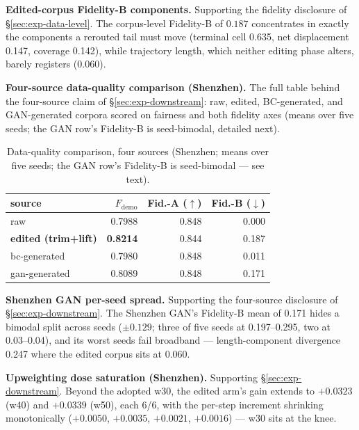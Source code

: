 \textbf{Edited-corpus Fidelity-B components.} Supporting the fidelity
disclosure of \S\ref{sec:exp-data-level}. The corpus-level Fidelity-B of
$0.187$ concentrates in exactly the components a rerouted tail must move
(terminal cell 0.635, net displacement 0.147, coverage 0.142), while
trajectory length, which neither editing phase alters, barely registers
(0.060).

\textbf{Four-source data-quality comparison (Shenzhen).} The full table behind
the four-source claim of \S\ref{sec:exp-downstream}: raw, edited, BC-gen\-er\-ated,
and GAN-generated corpora scored on fairness and both fidelity axes (means over
five seeds; the GAN row's Fidelity-B is seed-bimodal, detailed next).
\begin{table}[t]
\caption{Data-quality comparison, four sources (Shenzhen; means over five
seeds; the GAN row's Fidelity-B is seed-bimodal --- see text).}
\label{tab:l1}
\small
\begin{tabular}{lrrr}
\toprule
source & $F_{\mathrm{demo}}$ & Fid.-A ($\uparrow$) & Fid.-B ($\downarrow$) \\
\midrule
raw & 0.7988 & 0.848 & 0.000 \\
\textbf{edited (trim+lift)} & \textbf{0.8214} & 0.844 & 0.187 \\
bc-generated & 0.7980 & 0.848 & 0.011 \\
gan-generated & 0.8089 & 0.848 & 0.171 \\
\bottomrule
\end{tabular}
\end{table}

\textbf{Shenzhen GAN per-seed spread.} Supporting the four-source
disclosure of \S\ref{sec:exp-downstream}. The Shenzhen GAN's Fidelity-B mean
of 0.171 hides a bimodal split across seeds ($\pm 0.129$; three of five
seeds at 0.197--0.295, two at 0.03--0.04), and its worst seeds fail
broadband --- length-component divergence 0.247 where the edited corpus sits
at 0.060.

\textbf{Upweighting dose saturation (Shenzhen).} Supporting
\S\ref{sec:exp-downstream}. Beyond the adopted w30, the edited arm's gain
extends to $+0.0323$ (w40) and $+0.0339$ (w50), each 6/6, with the per-step
increment shrinking monotonically ($+0.0050$, $+0.0035$, $+0.0021$,
$+0.0016$) --- w30 sits at the knee.

